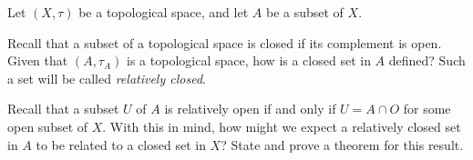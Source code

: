 \begin{activity} Let $(X, \tau)$ be a topological space, and let $A$ be a subset of $X$.
\ba
\item Recall that a subset of a topological space is closed if its complement is open. Given that $(A, \tau_A)$ is a topological space, how is a closed set in $A$ defined? Such a set will be called \emph{relatively closed}.

\item Recall that a subset $U$ of $A$ is relatively open if and only if $U = A \cap O$ for some open subset of $X$. With this in mind, how might we expect a relatively closed set in $A$ to be related to a closed set in $X$? State and prove a theorem for this result.  

\ea

\end{activity}

\begin{comment}

\ActivitySolution

\ba
\item A relatively closed set is the complement in $A$ of a relatively open set.

\item
\begin{theorem} Let $(X, \tau)$ be a topological space, and let $A$ be a subset of $X$. A set $C_A \in A$ is relatively closed if and only if $C_A = C \cap A$ for some closed set $C$ in $X$.  
\end{theorem}

\begin{proof} Let $(X, \tau)$ be a topological space, and let $A$ be a subset of $X$. Let $C_A$ be a relatively closed set in $A$. Then $A \setminus C_A$ is a relatively open set in $A$. Thus, $A \setminus C_A = A \cap O$ for some open set $O$ in $X$. Let $C = X \setminus O$. Since $O$ is open in $X$ we know that $C$ is closed in $X$. We will show that $C_A = A \cap C$. Now 
\[C_A = A \setminus (A \setminus C_A) = A \setminus (A \cap O) = A \setminus O = A \cap (X \setminus O) = A \cap C\]
as desired.

For the converse, let $C$ be a closed set in $X$ and suppose $C_A = C \cap A$. To show that $C_A$ is relatively closed, notice that 
\[A \setminus C_A = A \setminus (C \cap A) = A \setminus C = A \cap (X \setminus C).\]
Now $X \setminus C$ is an open set, so $A \setminus C_A$ is a relatively open set. We conclude that $C_A$ is a relatively closed set. 
\end{proof}


\ea

\end{comment}

